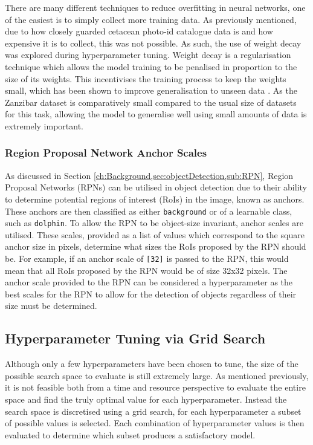 There are many different techniques to reduce overfitting in neural networks, one of the easiest is to simply collect more training data. As previously mentioned, due to how closely guarded cetacean photo-id catalogue data is and how expensive it is to collect, this was not possible. As such, the use of weight decay was explored during hyperparameter tuning. Weight decay is a regularisation technique which allows the model training to be penalised in proportion to the size of its weights. This incentivises the training process to keep the weights small, which has been shown to improve generalisation to unseen data \cite{krogh_simple_1991}. As the Zanzibar dataset is comparatively small compared to the usual size of datasets for this task, allowing the model to generalise well using small amounts of data is extremely important.

\subsubsection{Region Proposal Network Anchor Scales}\label{ch:cetDet,sec:ModelSelection,sub:TrainingHyperparameters,subsub:RPNAnchorScales}

As discussed in Section \ref{ch:Background,sec:objectDetection,sub:RPN}, Region Proposal Networks (RPNs) can be utilised in object detection due to their ability to determine potential regions of interest (RoIs) in the image, known as anchors. These anchors are then classified as either \texttt{background} or of a learnable class, such as \texttt{dolphin}. To allow the RPN to be object-size invariant, anchor scales are utilised. These scales, provided as a list of values which correspond to the square anchor size in pixels, determine what sizes the RoIs proposed by the RPN should be. For example, if an anchor scale of \texttt{[32]} is passed to the RPN, this would mean that all RoIs proposed by the RPN would be of size 32x32 pixels. The anchor scale provided to the RPN can be considered a hyperparameter as the best scales for the RPN to allow for the detection of objects regardless of their size must be determined. 

\subsection{Hyperparameter Tuning via Grid Search}\label{ch:cetDet,sec:ModelSelection,sub:HyperparameterTuning}

Although only a few hyperparameters have been chosen to tune, the size of the possible search space to evaluate is still extremely large. As mentioned previously, it is not feasible both from a time and resource perspective to evaluate the entire space and find the truly optimal value for each hyperparameter. Instead the search space is discretised using a grid search, for each hyperparameter a subset of possible values is selected. Each combination of hyperparameter values is then evaluated to determine which subset produces a satisfactory model. 

